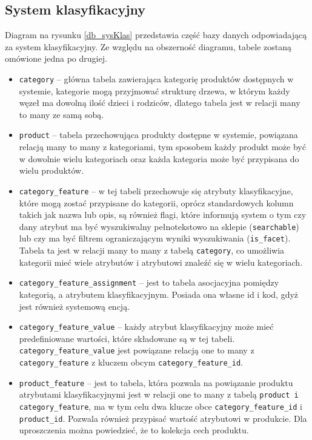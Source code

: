 \subsection{System klasyfikacyjny}
Diagram na rysunku \ref{db_sysKlas} przedstawia część bazy danych odpowiadającą za system klasyfikacyjny. Ze względu na obszerność diagramu, tabele zostaną omówione jedna po drugiej. 
\begin{itemize}
	\item \texttt{category} -- główna tabela zawierająca kategorię produktów dostępnych w systemie, kategorie mogą przyjmować strukturę drzewa, w którym każdy węzeł ma dowolną ilość dzieci i rodziców, dlatego tabela jest w relacji many to many ze samą sobą. 
	\item \texttt{product} -- tabela przechowująca produkty dostępne w systemie, powiązana relacją many to many z kategoriami, tym sposobem każdy produkt może być w dowolnie wielu kategoriach oraz każda kategoria może być przypisana do wielu produktów. 
	\item \texttt{category\_feature} -- w tej tabeli przechowuje się atrybuty klasyfikacyjne, które mogą zostać przypisane do kategorii, oprócz standardowych kolumn takich jak nazwa lub opis, są również flagi, które informują system o tym czy dany atrybut ma być wyszukiwalny pełnotekstowo na sklepie (\texttt{searchable}) lub czy ma być filtrem ograniczającym wyniki wyszukiwania (\texttt{is\_facet}). Tabela ta jest w relacji many to many z tabelą \texttt{category}, co umożliwia kategorii mieć wiele atrybutów i atrybutowi znaleźć się w wielu kategoriach.
	\item \texttt{category\_feature\_assignment} -- jest to tabela asocjacyjna pomiędzy kategorią, a atrybutem klasyfikacyjnym. Posiada ona własne id i kod, gdyż jest również systemową encją.
	\item \texttt{category\_feature\_value} -- każdy atrybut klasyfikacyjny może mieć predefiniowane wartości, które składowane są w tej tabeli. \texttt{category\_feature\_value} jest powiązane relacją one to many z \texttt{category\_feature} z kluczem obcym \texttt{category\_feature\_id}.
	\item \texttt{product\_feature} -- jest to tabela, która pozwala na powiązanie produktu atrybutami klasyfikacyjnymi jest w relacji one to many z tabelą \texttt{product i category\_feature}, ma w tym celu dwa klucze obce  \texttt{category\_feature\_id} i  \texttt{product\_id}. Pozwala również przypisać wartość atrybutowi w produkcie. Dla uproszczenia można powiedzieć, że to kolekcja cech produktu. 
\end{itemize}
